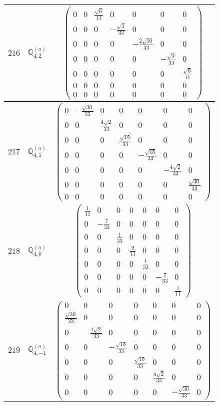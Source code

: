 \documentclass[fleqn,8pt,landscape]{jsarticle}
\begin{document}
\begin{center}
\begin{longtable}{ccc}
$ 216 $ & $ \mathbb{Q}_{4,2}^{(a)} $ & $ \begin{pmatrix} 0 & 0 & \frac{\sqrt{6}}{11} & 0 & 0 & 0 & 0 \\ 0 & 0 & 0 & - \frac{\sqrt{3}}{33} & 0 & 0 & 0 \\ 0 & 0 & 0 & 0 & - \frac{2 \sqrt{10}}{33} & 0 & 0 \\ 0 & 0 & 0 & 0 & 0 & - \frac{\sqrt{3}}{33} & 0 \\ 0 & 0 & 0 & 0 & 0 & 0 & \frac{\sqrt{6}}{11} \\ 0 & 0 & 0 & 0 & 0 & 0 & 0 \\ 0 & 0 & 0 & 0 & 0 & 0 & 0 \end{pmatrix} $ \\ \hline
$ 217 $ & $ \mathbb{Q}_{4,1}^{(a)} $ & $ \begin{pmatrix} 0 & - \frac{\sqrt{30}}{33} & 0 & 0 & 0 & 0 & 0 \\ 0 & 0 & \frac{4 \sqrt{2}}{33} & 0 & 0 & 0 & 0 \\ 0 & 0 & 0 & \frac{\sqrt{15}}{33} & 0 & 0 & 0 \\ 0 & 0 & 0 & 0 & - \frac{\sqrt{15}}{33} & 0 & 0 \\ 0 & 0 & 0 & 0 & 0 & - \frac{4 \sqrt{2}}{33} & 0 \\ 0 & 0 & 0 & 0 & 0 & 0 & \frac{\sqrt{30}}{33} \\ 0 & 0 & 0 & 0 & 0 & 0 & 0 \end{pmatrix} $ \\ \hline
$ 218 $ & $ \mathbb{Q}_{4,0}^{(a)} $ & $ \begin{pmatrix} \frac{1}{11} & 0 & 0 & 0 & 0 & 0 & 0 \\ 0 & - \frac{7}{33} & 0 & 0 & 0 & 0 & 0 \\ 0 & 0 & \frac{1}{33} & 0 & 0 & 0 & 0 \\ 0 & 0 & 0 & \frac{2}{11} & 0 & 0 & 0 \\ 0 & 0 & 0 & 0 & \frac{1}{33} & 0 & 0 \\ 0 & 0 & 0 & 0 & 0 & - \frac{7}{33} & 0 \\ 0 & 0 & 0 & 0 & 0 & 0 & \frac{1}{11} \end{pmatrix} $ \\ \hline
$ 219 $ & $ \mathbb{Q}_{4,-1}^{(a)} $ & $ \begin{pmatrix} 0 & 0 & 0 & 0 & 0 & 0 & 0 \\ \frac{\sqrt{30}}{33} & 0 & 0 & 0 & 0 & 0 & 0 \\ 0 & - \frac{4 \sqrt{2}}{33} & 0 & 0 & 0 & 0 & 0 \\ 0 & 0 & - \frac{\sqrt{15}}{33} & 0 & 0 & 0 & 0 \\ 0 & 0 & 0 & \frac{\sqrt{15}}{33} & 0 & 0 & 0 \\ 0 & 0 & 0 & 0 & \frac{4 \sqrt{2}}{33} & 0 & 0 \\ 0 & 0 & 0 & 0 & 0 & - \frac{\sqrt{30}}{33} & 0 \end{pmatrix} $ \\ \hline

\end{longtable}
\end{center}
\end{document}
